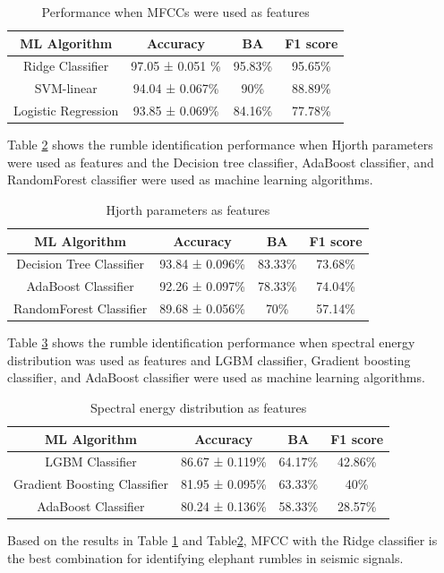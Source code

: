 \documentclass[applsci,article,accept,moreauthors,pdftex]{Definitions/mdpi}
\begin{document}
\begin{table}[h]
	\centering
	\begin{tabular}{|c|c|c|c|}
		\hline
		\textbf{ML Algorithm} & \textbf{Accuracy} & \textbf{BA} & \textbf{F1 score} \\
		\hline
		Ridge Classifier & 97.05 ± 0.051 \% & 95.83\% & 95.65\% \\
		\hline
		SVM-linear & 94.04 ± 0.067\% & 90\% & 88.89\% \\
		\hline
		Logistic Regression & 93.85  ± 0.069\% & 84.16\% & 77.78\% \\
		\hline
	\end{tabular}
	\caption{Performance when MFCCs were used as features}
	\label{tab_MFCC}
\end{table}

Table \ref{tab_Hj} shows the rumble identification performance when Hjorth parameters were used as features and the Decision tree classifier, AdaBoost classifier, and RandomForest classifier were used as machine learning algorithms. 
\begin{table}[h]
	\centering
	\begin{tabular}{|c|c|c|c|}
		\hline
		\textbf{ML Algorithm} & \textbf{Accuracy} & \textbf{BA} & \textbf{F1 score} \\
		\hline
		Decision Tree Classifier & 93.84 ± 0.096\% & 83.33\% & 73.68\% \\
		\hline
		AdaBoost Classifier & 92.26 ± 0.097\% & 78.33\% & 74.04\% \\
		\hline
		RandomForest Classifier & 89.68  ± 0.056\% & 70\% & 57.14\% \\
		\hline
	\end{tabular}
	\caption{Hjorth parameters as features}
	\label{tab_Hj}
\end{table}
Table \ref{tab_SED} shows the rumble identification performance when spectral energy distribution was used as features and LGBM classifier, Gradient boosting classifier, and AdaBoost classifier were used as machine learning algorithms. 
\begin{table}[h]
	\centering
	\begin{tabular}{|c|c|c|c|}
		\hline
		\textbf{ML Algorithm} & \textbf{Accuracy} & \textbf{BA} & \textbf{F1 score} \\
		\hline
		LGBM Classifier & 86.67 ± 0.119\% & 64.17\% & 42.86\% \\
		\hline
		Gradient Boosting Classifier & 81.95 ± 0.095\% & 63.33\% & 40\% \\
		\hline
		AdaBoost Classifier & 80.24  ± 0.136\% & 58.33\% & 28.57\% \\
		\hline
	\end{tabular}
	\caption{Spectral energy distribution as features}
	\label{tab_SED}
\end{table}
Based on the results in Table \ref{tab_MFCC} and Table\ref{tab_Hj}, MFCC with the Ridge classifier is the best combination for identifying elephant rumbles in seismic signals.
\end{document}
